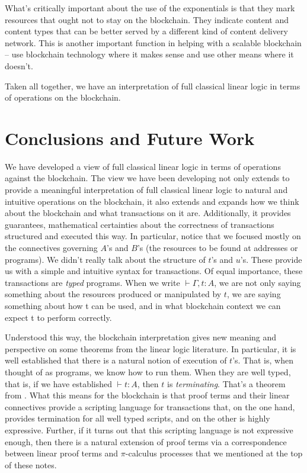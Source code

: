 \documentclass[]{acm_proc_article-sp}
\numberwithin{equation}{subsection}
\begin{document}
What's critically important about the use of the exponentials is that
they mark resources that ought not to stay on the blockchain. They
indicate content and content types that can be better served by a
different kind of content delivery network. This is another important
function in helping with a scalable blockchain -- use blockchain
technology where it makes sense and use other means where it doesn't.

Taken all together, we have an interpretation of full classical linear
logic in terms of operations on the blockchain.

\section{Conclusions and Future Work}

We have developed a view of full classical linear logic in terms of
operations against the blockchain. The view we have been developing
not only extends to provide a meaningful interpretation of full
classical linear logic to natural and intuitive operations on the
blockchain, it also extends and expands how we think about the
blockchain and what transactions on it are. Additionally, it provides
guarantees, mathematical certainties about the correctness of
transactions structured and executed this way. In particular, notice
that we focused mostly on the connectives governing $A$'s and $B$'s (the
resources to be found at addresses or programs). We didn't really talk
about the structure of $t$'s and $u$'s. These provide us with a simple and
intuitive syntax for transactions. Of equal importance, these
transactions are \emph{typed} programs. When we write $\vdash \Gamma, t : A$, we are
not only saying something about the resources produced or manipulated
by $t$, we are saying something about how t can be used, and in what
blockchain context we can expect t to perform correctly.

Understood this way, the blockchain interpretation gives new meaning
and perspective on some theorems from the linear logic literature. In
particular, it is well established that there is a natural notion of
execution of $t$'s. That is, when thought of as programs, we know how
to run them. When they are well typed, that is, if we have established
$\vdash t : A$, then $t$ is \emph{terminating}. That's a theorem from
\cite{DBLP:journals/tcs/Abramsky93}. What this means for the
blockchain is that proof terms and their linear connectives provide a
scripting language for transactions that, on the one hand, provides
termination for all well typed scripts, and on the other is highly
expressive. Further, if it turns out that this scripting language is
not expressive enough, then there is a natural extension of proof
terms via a correspondence between linear proof terms and
{$\pi$}-calculus processes that we mentioned at the top of these
notes.
\end{document}

